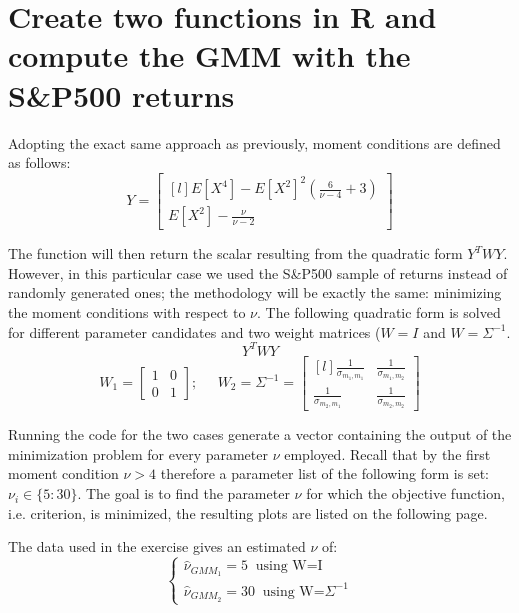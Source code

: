 \newpage
\section{Create two functions in R and compute the GMM with the S\&P500 returns}

Adopting the exact same approach as previously, moment conditions are defined as follows:
\begin{equation*}
    Y=    
    \begin{bmatrix}[l]
    E[X^4]-E[X^2]^2(\frac{6}{\nu-4}+3)  \\
    E[X^2]-\frac{\nu}{\nu-2}
    \end{bmatrix}
\end{equation*}

The function will then return the scalar resulting from the quadratic form $Y^TWY$. However, in this particular case we used the S\&P500 sample of returns instead of randomly generated ones; the methodology will be exactly the same: minimizing the moment conditions with respect to $\nu$. The following quadratic form is solved for different parameter candidates and two weight matrices ($W=I$ and $W=\Sigma^{-1}$.
\begin{equation*}
    Y^TWY
\end{equation*}
\begin{equation*}
    W_1=
    \begin{bmatrix}
        1   &0 \\
        0   &1
    \end{bmatrix};\;\;\;\;\;
    W_2=\Sigma^{-1}=
    \begin{bmatrix}[l]
        \frac{1}{\sigma_{m_1,m_1}}    &\frac{1}{\sigma_{m_1,m_2}} \\
        \frac{1}{\sigma_{m_2,m_1}}    &\frac{1}{\sigma_{m_2,m_2}}
    \end{bmatrix}
\end{equation*}

Running the code for the two cases generate a vector containing the output of the minimization problem for every parameter $\nu$ employed. Recall that by the first moment condition $\nu>4$ therefore a parameter list of the following form is set: $\nu_i \in \{5:30\}$. The goal is to find the parameter $\nu$ for which the objective function, i.e. criterion, is minimized, the resulting plots are listed on the following page.
\bigskip\par
The data used in the exercise gives an estimated $\nu$ of:
\begin{equation*}
    \begin{cases}
    \widehat{\nu}_{GMM_{1}}=5 \;\;\text{using W=I}\\
    \widehat{\nu}_{GMM_{2}}=30 \;\;\text{using W=}\Sigma^{-1}
\end{cases}
\end{equation*}

